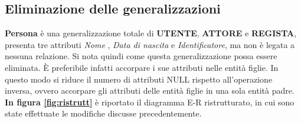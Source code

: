 \documentclass[12pt,a4paper]{article}
\begin{document}
\subsection{Eliminazione delle generalizzazioni}
\textbf {Persona} è una generalizzazione totale di \textbf{UTENTE}, \textbf{ATTORE} e \textbf{REGISTA}, presenta
tre attributi \textit{Nome} , \textit{Data di nascita} e \textit{Identificatore}, ma non è legata a nessuna relazione.
Si nota quindi come questa generalizzazione possa essere eliminata. È preferibile infatti
accorpare i sue attributi nelle entità figlie. In questo modo si riduce il numero di attributi NULL rispetto all'operazione inversa,
ovvero accorpare gli attributi delle entità figlie in una sola entità padre.\newline
\textbf{In figura \ref{fig:ristrutt}} è riportato il diagramma E-R ristrutturato, in cui sono state effettuate le modifiche discusse precedentemente.
\end{document}
